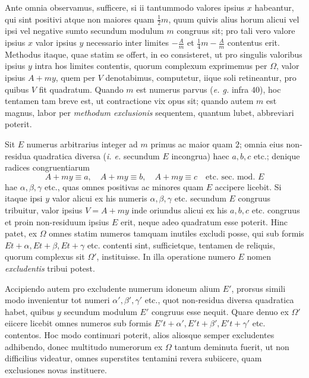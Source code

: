 Ante omnia observamus, sufficere, si ii tantummodo valores ipsius \(x\) habeantur, qui sint positivi atque non maiores quam \(\frac12m\), quum quivis alius horum alicui vel ipsi vel negative sumto secundum modulum \(m\) congruus sit; pro tali vero valore ipsius \(x\) valor ipsius \(y\) necessario inter limites \(-\frac Am\) et \(\frac14m-\frac Am\) contentus erit. Methodus itaque, quae statim se offert, in eo consisteret, ut pro singulis valoribus ipsius \(y\) intra hos limites contentis, quorum complexum exprimemus per \(\Omega\), valor ipsius \(A+my\), quem per \(V\) denotabimus, computetur, iique soli retineantur, pro quibus \(V\) fit quadratum. Quando \(m\) est numerus parvus (\textit{e. g.} infra \(40\)), hoc tentamen tam breve est, ut contractione vix opus sit; quando autem \(m\) est magnus, labor per \textit{methodum exclusionis} sequentem, quantum lubet, abbreviari poterit.

Sit \(E\) numerus arbitrarius integer ad \(m\) primus ac maior quam \(2\); omnia eius non-residua quadratica diversa (\textit{i. e.} secundum \(E\) incongrua) haec \(a,\allowbreak b,\allowbreak c\) etc.;
denique radices congruentiarum
\[A+my\equiv a,\quad A+my\equiv b,\quad A+my\equiv c\quad\text{etc. sec. mod. }E\]
hae \(\alpha,\allowbreak \beta,\allowbreak \gamma\) etc., quas omnes positivas ac minores quam \(E\) accipere licebit. Si itaque ipsi \(y\) valor alicui ex his numeris \(\alpha,\allowbreak \beta,\allowbreak \gamma\) etc. secundum \(E\) congruus tribuitur, valor ipsius \(V=A+my\) inde oriundus alicui ex his \(a,\allowbreak b,\allowbreak c\) etc. congruus et proin non-residuum ipsius \(E\) erit, neque adeo quadratum esse poterit. Hinc patet, ex \(\Omega\) omnes statim numeros tamquam inutiles excludi posse, qui sub formis \(Et+\alpha,\allowbreak Et+\beta,\allowbreak Et+\gamma\) etc. contenti sint, sufficietque, tentamen de reliquis, quorum complexus sit \(\Omega'\), instituisse. In illa operatione numero \(E\) nomen \textit{excludentis} tribui potest.

Accipiendo autem pro excludente numerum idoneum alium \(E'\), prorsus simili modo invenientur tot numeri \(\alpha',\allowbreak \beta',\allowbreak \gamma'\) etc., quot non-residua diversa quadratica habet, quibus \(y\) secundum modulum \(E'\) congruus esse nequit. Quare denuo ex \(\Omega'\) eiicere licebit omnes numeros sub formis \(E't+\alpha',\allowbreak E't+\beta',\allowbreak E't+\gamma'\) etc. contentos. Hoc modo continuari poterit, alios aliosque semper excludentes adhibendo, donec multitudo numerorum ex \(\Omega\) tantum deminuta fuerit, ut non difficilius videatur, omnes superstites tentamini revera subiicere, quam exclusiones novas instituere.

